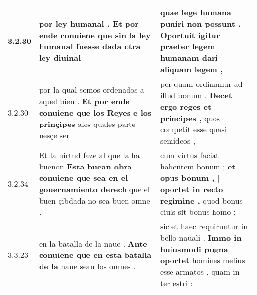 \begin{tabular}{|p{1cm}|p{6.5cm}|p{6.5cm}|}
3.2.30 & por ley humanal . \textbf{ Et por ende conuiene que sin la ley humanal fuesse } dada otra ley diuinal & quae lege humana puniri non possunt . \textbf{ Oportuit igitur praeter legem humanam } dari aliquam legem , \\\hline
3.2.30 & por la qual somos ordenados a aquel bien . \textbf{ Et por ende conuiene que los Reyes e los prinçipes } alos quales parte nesçe ser & per quam ordinamur ad illud bonum . \textbf{ Decet ergo reges et principes , } quos competit esse quasi semideos , \\\hline
3.2.34 & Et la uirtud faze al que la ha buenon \textbf{ Esta buean obra conuiene que sea en el gouernamiento derech } que el buen çibdada no sea buen omne . & cum virtus faciat habentem bonum ; \textbf{ et opus bonum , | oportet in recto regimine , } quod bonus ciuis sit bonus homo ; \\\hline
3.3.23 & en la batalla de la naue . \textbf{ Ante conuiene que en esta batalla de la } naue sean los omnes . & sic et haec requiruntur in bello nauali . \textbf{ Immo in huiusmodi pugna oportet } homines melius esse armatos , quam in terrestri : \\\hline

\end{tabular}
